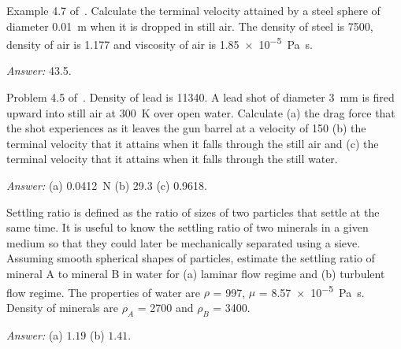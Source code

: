 
\begin{question}
	Example 4.7 of~\cite{gaskell}. Calculate the terminal velocity attained by a steel sphere of diameter \SI{0.01}{\metre} when it is dropped in still air. The density of steel is \SI{7500}{\kgpmc}, density of air is \SI{1.177}{\kgpmc} and viscosity of air is \SI{1.85e-5}{\pascal\second}.
\end{question}
\begin{solution}[print]
{\it Answer:} \SI{43.5}{\mps}.
\end{solution}


\begin{question}
	Problem 4.5 of~\cite{gaskell}. Density of lead is \SI{11340}{\kgpmc}. A lead shot of diameter \SI{3}{\mm} is fired upward into still air at \SI{300}{\kelvin} over open water. Calculate (a) the drag force that the shot experiences as it leaves the gun barrel at a velocity of \SI{150}{\mps} (b) the terminal velocity that it attains when it falls through the still air and (c) the terminal velocity that it attains when it falls through the still water.
\end{question}
\begin{solution}[print]
	{\it Answer:} (a) \SI{0.0412}{\newton} (b) \SI{29.3}{\mps} (c) \SI{0.9618}{\mps}.
\end{solution}


\begin{question}
Settling ratio is defined as the ratio of sizes of two particles that settle at the same time. It is useful to know the settling ratio of two minerals in a given medium so that they could later be mechanically separated using a sieve. Assuming smooth spherical shapes of particles, estimate the settling ratio of mineral A to mineral B in water for (a) laminar flow regime and (b) turbulent flow regime. The properties of water are $\rho$ = \SI{997}{\kgpmc}, $\mu$ = \SI{8.57e-5}{\pascal\second}. Density of minerals are $\rho_A$ = \SI{2700}{\kgpmc} and $\rho_B$ = \SI{3400}{\kgpmc}.
\end{question}
\begin{solution}[print]
{\it Answer:} (a) $1.19$ (b) $1.41$.
\end{solution}

